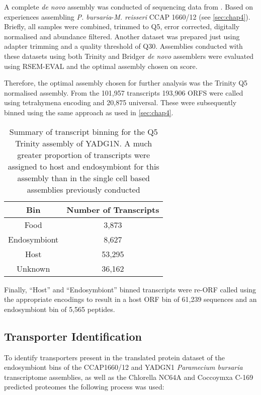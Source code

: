 A complete \textit{de novo} assembly was conducted of sequencing data
from \citep{Kodama2014c}.  Based on experiences assembling
\textit{P. bursaria}-\textit{M. reisseri} CCAP 1660/12 (see \cref{sec:chap4}).
Briefly, all samples were combined, trimmed to Q5, 
error corrected, digitally normalised and abundance filtered.  Another dataset
was prepared just using adapter trimming and a quality threshold of Q30.
Assemblies conducted with these datasets using both Trinity and Bridger
\textit{de novo} assemblers were evaluated using RSEM-EVAL and the optimal
assembly chosen on score. 

Therefore, the optimal assembly chosen for further analysis was the Trinity
Q5 normalised assembly.
From the 101,957 transcripts 193,906 ORFS were called using tetrahymena 
encoding and 20,875 universal.
These were subsequently binned using the same approach as used in 
\cref{sec:chap4}. 

\begin{table}
    \centering
    \begin{tabular}{|c|c|}
        \hline
        \textbf{Bin} & \textbf{Number of Transcripts} \\
        \hline
        Food & 3,873 \\
        Endosymbiont & 8,627 \\
        Host & 53,295 \\
        Unknown & 36,162 \\
        \hline
    \end{tabular}
    \caption[YADG1N Transcript Binning Summary]{Summary of transcript
        binning for the Q5 Trinity assembly of YADG1N.  
        A much greater proportion of transcripts were assigned
        to host and endosymbiont for this assembly than in the single cell
    based assemblies previously conducted}
\end{table}
Finally, ``Host'' and ``Endosymbiont'' binned transcripts 
were re-ORF called using the appropriate encodings to result in a 
host ORF bin of 61,239 sequences
and an endosymbiont bin of 5,565 peptides. 

\subsection{Transporter Identification}
To identify transporters present in the translated protein dataset of the 
endosymbiont bins of the CCAP1660/12 and YADGN1 
\textit{Paramecium bursaria} transcriptome assemblies, as well as the Chlorella NC64A 
and Coccoymxa C-169 predicted proteomes the following process was used:

